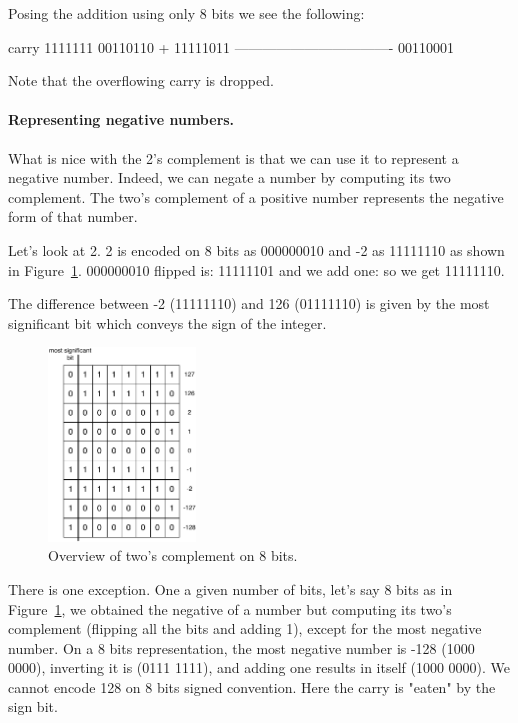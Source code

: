 \documentclass[a4paper,10pt,twoside]{book}
\begin{document}
Posing the addition using only 8 bits we see the following:

\begin{code}{}
carry	1111111 
		 00110110
+		11111011	
	----------------------------------
		 00110001	
\end{code}

Note that the overflowing carry is dropped.

\paragraph{Representing negative numbers.}
What is nice with the 2's complement is that we can use it to represent a negative number. Indeed, we can negate a number by computing its two complement. The two's complement of a positive number represents the negative form of that number.

Let's look at 2. 2 is encoded on 8 bits as 000000010 and -2 as 11111110 as shown in Figure~\ref{negativePositive}.
000000010 flipped is: 11111101 and we add one: so we get 11111110.



The difference between  -2 (11111110) and 126 (01111110) is given by the most significant bit which conveys the sign of the integer.

\begin{figure}[h]
\begin{center}
\includegraphics[width=0.35\textwidth]{8bits-Table}
\caption{Overview of two's complement on 8 bits.\label{negativePositive}}
\end{center}
\end{figure}



There is one exception. One a given number of bits, let's say 8 bits as in Figure~\ref{negativePositive},
we obtained the negative of a number but computing its two's complement (flipping all the bits and adding 1), except for the most negative number. On a 8 bits representation, the most negative number is -128 (1000 0000), inverting it is (0111 1111), and adding one results in itself (1000 0000). We cannot encode 128 on 8 bits signed convention. Here the carry is "eaten" by the sign bit. 
\end{document}
